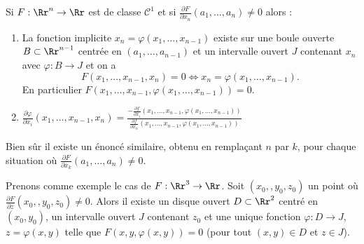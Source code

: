 \documentclass[11pt, class=report,crop=false]{standalone}
\begin{document}
\begin{theoreme}
Si $F : \Rr^n\to \Rr$ est de classe $\mathcal{C}^1$ et si $\displaystyle \frac{\partial F}{\partial x_{n}}  (a_1,\ldots,a_n) \neq 0$ alors : 
\begin{enumerate}
    \item  La fonction implicite $x_n = \varphi (x_1, \ldots, x_{n-1})$ existe sur une boule ouverte $B \subset \Rr^{n-1}$ centrée en $(a_1, \ldots,  a_{n-1})$  et un intervalle ouvert $J$ contenant $x_n$ avec $\varphi : B \to J$ et on a 
$$F(x_1,\ldots,x_{n-1},x_n)=0 \iff x_{n} = \varphi (x_{1},   \ldots,  x_{n-1}).$$
En particulier $F(x_{1}, \ldots, x_{n-1}, \varphi(x_{1}, \ldots, x_{n-1})) = 0$.

    \item $\displaystyle \frac{\partial \varphi}{\partial x_{i}} (x_1,\ldots,x_{n-1},x_n)
     =  \frac{- \frac{\partial f}{\partial x_{i}} (x_{1},  \ldots,  x_{n-1} , \varphi(x_{1},  \ldots,  x_{n-1}))}{\frac{\partial f}{\partial x_{n}} (x_{1},  \ldots,  x_{n-1} , \varphi(x_{1},  \ldots,  x_{n-1}))}$
\end{enumerate}
\end{theoreme}

Bien sûr il existe un énoncé similaire, obtenu en remplaçant $n$ par $k$, pour chaque situation où $\displaystyle \frac{\partial F}{\partial x_{k}}  (a_1,\ldots,a_n) \neq 0$.

Prenons comme exemple le cas de $F : \Rr^3 \to \Rr$.
Soit $(x_0,,y_0,z_0)$ un point où $\frac{\partial F}{\partial z} (x_0,,y_0,z_0)  \neq 0$.
Alors il existe un disque ouvert $D \subset \Rr^2$ centré en $(x_0,y_0)$, un intervalle ouvert $J$ contenant $z_0$ et une unique fonction $\varphi : D \to J$,  $z=\varphi(x,y)$ telle que $F(x,y, \varphi(x,y)) = 0$ (pour tout $(x,y)\in D$ et $z\in J$).
 
\end{document}
